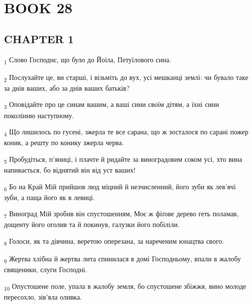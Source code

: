 \section{BOOK 28}
\subsection{CHAPTER 1}
\begin{tcolorbox}
\textsubscript{1} Слово Господнє, що було до Йоіла, Петуїлового сина.
\end{tcolorbox}
\begin{tcolorbox}
\textsubscript{2} Послухайте це, ви старші, і візьміть до вух, усі мешканці землі: чи бувало таке за днів ваших, або за днів ваших батьків?
\end{tcolorbox}
\begin{tcolorbox}
\textsubscript{3} Оповідайте про це синам вашим, а ваші сини своїм дітям, а їхні сини поколінню наступному.
\end{tcolorbox}
\begin{tcolorbox}
\textsubscript{4} Що лишилось по гусені, зжерла те все сарана, що ж зосталося по сарані пожер коник, а решту по конику зжерла черва.
\end{tcolorbox}
\begin{tcolorbox}
\textsubscript{5} Пробудіться, п'яниці, і плачте й ридайте за виноградовим соком усі, хто вина напивається, бо віднятий він від уст ваших!
\end{tcolorbox}
\begin{tcolorbox}
\textsubscript{6} Бо на Край Мій прийшов люд міцний й незчисленний, його зуби як лев'ячі зуби, а паща його як в левиці.
\end{tcolorbox}
\begin{tcolorbox}
\textsubscript{7} Виноград Мій зробив він спустошенням, Моє ж фіґове дерево геть поламав, дощенту його оголив та й покинув, галузки його побіліли.
\end{tcolorbox}
\begin{tcolorbox}
\textsubscript{8} Голоси, як та дівчина, веретою оперезана, за нареченим юнацтва свого.
\end{tcolorbox}
\begin{tcolorbox}
\textsubscript{9} Жертва хлібна й жертва лита спинилася в домі Господньому, впали в жалобу священики, слуги Господні.
\end{tcolorbox}
\begin{tcolorbox}
\textsubscript{10} Опустошене поле, упала в жалобу земля, бо спустошене збіжжя, вино молоде пересохло, зів'яла оливка.
\end{tcolorbox}
